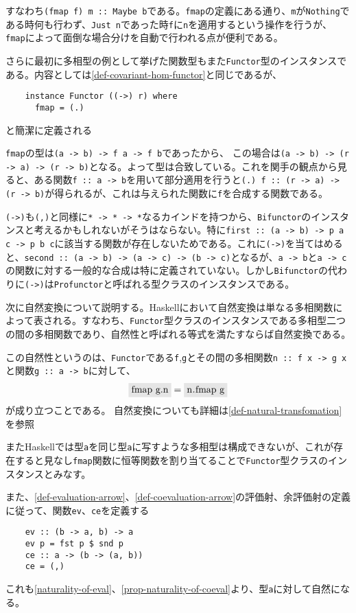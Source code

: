 \documentclass[uplatex,dvipdfmx]{jsarticle}
\newcommand{\pr}[1]{\colorbox[rgb]{0.9,0.9,0.9}{\lstinline{#1}}}
\newcommand{\refcti}[1]{\cite{cti}\ref{#1}}
\begin{document}
  すなわち\pr{(fmap f) m :: Maybe b}である。\pr{fmap}の定義にある通り、\pr{m}が\pr{Nothing}である時何も行わず、\pr{Just n}であった時\pr{f}に\pr{n}を適用するという操作を行うが、\pr{fmap}によって面倒な場合分けを自動で行われる点が便利である。
  
  さらに最初に多相型の例として挙げた関数型もまた\pr{Functor}型のインスタンスである。内容としては\refcti{def-covariant-hom-functor}と同じであるが、
  \begin{lstlisting}
    instance Functor ((->) r) where
      fmap = (.)
  \end{lstlisting}
  と簡潔に定義される

  \pr{fmap}の型は\pr{(a -> b) -> f a -> f b}であったから、
  この場合は\pr{(a -> b) -> (r -> a) -> (r -> b)}となる。よって型は合致している。これを関手の観点から見ると、ある関数\pr{f :: a -> b}を用いて部分適用を行うと\pr{(.) f :: (r -> a) -> (r -> b)}が得られるが、これは与えられた関数に\pr{f}を合成する関数である。

  \pr{(->)}も\pr{(,)}と同様に\pr{* -> * -> *}なるカインドを持つから、\pr{Bifunctor}のインスタンスと考えるかもしれないがそうはならない。特に\pr{first :: (a -> b) -> p a c -> p b c}に該当する関数が存在しないためである。これに\pr{(->)}を当てはめると、\pr{second :: (a -> b) -> (a -> c) -> (b -> c)}となるが、\pr{a -> b}と\pr{a -> c}の関数に対する一般的な合成は特に定義されていない。しかし\pr{Bifunctor}の代わりに\pr{(->)}は\pr{Profunctor}と呼ばれる型クラスのインスタンスである。

  次に自然変換について説明する。Haskellにおいて自然変換は単なる多相関数によって表される。すなわち、\pr{Functor}型クラスのインスタンスである多相型二つの間の多相関数であり、自然性と呼ばれる等式を満たすならば自然変換である。

  この自然性というのは、\pr{Functor}である\pr{f},\pr{g}とその間の多相関数\pr{n :: f x -> g x}と関数\pr{g :: a -> b}に対して、
  \[\pr{fmap g.n}=\pr{n.fmap g}\]が成り立つことである。
  自然変換についても詳細は\refcti{def-natural-transfomation}を参照

  またHaskellでは型\pr{a}を同じ型\pr{a}に写すような多相型は構成できないが、これが存在すると見なし\pr{fmap}関数に恒等関数を割り当てることで\pr{Functor}型クラスのインスタンスとみなす。

  また、\refcti{def-evaluation-arrow}、\refcti{def-coevaluation-arrow}の評価射、余評価射の定義に従って、関数\pr{ev}、\pr{ce}を定義する
  \begin{lstlisting}
    ev :: (b -> a, b) -> a
    ev p = fst p $ snd p
    ce :: a -> (b -> (a, b))
    ce = (,)
  \end{lstlisting}
  これも\refcti{naturality-of-eval}、\refcti{prop-naturality-of-coeval}より、型\pr{a}に対して自然になる。
\end{document}
